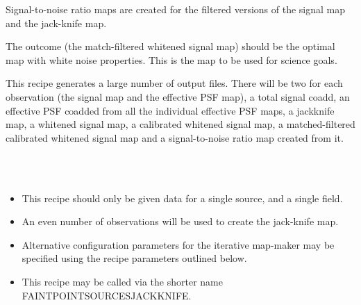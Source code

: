 \documentclass[twoside,11pt]{article}
\renewcommand{\_}{\texttt{\symbol{95}}}
\newcommand{\sstnotes}[1]{\item[Notes:] \mbox{} \\[1.3ex] #1}
\newcommand{\sstitemlist}[1]{
  \mbox{} \\
  \vspace{-3.5ex}
  \begin{itemize}
     #1
  \end{itemize}
}
\newcommand{\sstitem}{\item}
\newcommand{\sstnotes}[1]{\item[Notes:] #1 }
\newcommand{\sstitemlist}[1]{
      \begin{itemize}
         #1
      \end{itemize}
      \\
   }
\newcommand{\sstitem}{\item}
\begin{document}
{{{         \sstitem
         Signal-to-noise ratio maps are created for the filtered
         versions of the signal map and the jack-knife map.

      }
      The outcome (the match-filtered whitened signal map) should be the
      optimal map with white noise properties. This is the map to be
      used for science goals.

      This recipe generates a large number of output files. There will
      be two for each observation (the signal map and the effective PSF
      map), a total signal coadd, an effective PSF coadded from all the
      individual effective PSF maps, a jackknife map, a whitened signal
      map, a calibrated whitened signal map, a matched-filtered
      calibrated whitened signal map and a signal-to-noise ratio map
      created from it.
   }
   \sstnotes{
      \sstitemlist{

         \sstitem
         This recipe should only be given data for a single source, and
         a single field.

         \sstitem
         An even number of observations will be used to create the
         jack-knife map.

         \sstitem
         Alternative configuration parameters for the iterative
         map-maker may be specified using the recipe parameters outlined
         below.

         \sstitem
         This recipe may be called via the shorter name
         FAINT\_POINT\_SOURCES\_JACKKNIFE.

}}}
\end{document}
